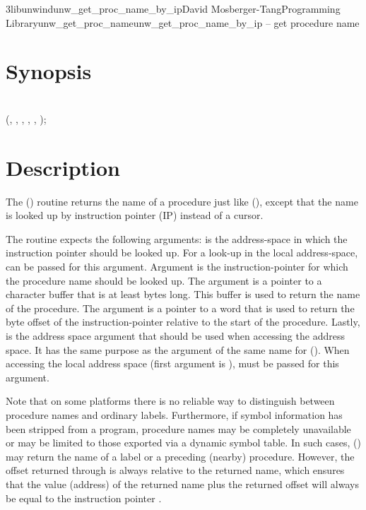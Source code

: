 \documentclass{article}
\begin{document}
\begin{Name}{3libunwind}{unw\_get\_proc\_name\_by\_ip}{David Mosberger-Tang}{Programming Library}{unw\_get\_proc\_name}unw\_get\_proc\_name\_by\_ip -- get procedure name
\end{Name}

\section{Synopsis}

\\

 (, , ,  , , );\\

\section{Description}

The () routine returns the name of
a procedure just like (), except that the
name is looked up by instruction pointer (IP) instead of a cursor.

The routine expects the following arguments:  is the
address-space in which the instruction pointer should be looked up.
For a look-up in the local address-space,
 can be passed for this argument.
Argument  is the instruction-pointer for which the procedure
name should be looked up.  The  argument is a pointer to
a character buffer that is at least  bytes long.  This buffer
is used to return the name of the procedure.  The  argument
is a pointer to a word that is used to return the byte offset of the
instruction-pointer relative to the start of the procedure.
Lastly,  is the address space argument that should be used
when accessing the address space.  It has the same purpose as the
argument of the same name for ().  When
accessing the local address space (first argument is
),  must be passed for this
argument.

Note that on some platforms there is no reliable way to distinguish
between procedure names and ordinary labels.  Furthermore, if symbol
information has been stripped from a program, procedure names may be
completely unavailable or may be limited to those exported via a
dynamic symbol table.  In such cases,
() may return the name of a label
or a preceding (nearby) procedure.  However, the offset returned
through  is always relative to the returned name, which
ensures that the value (address) of the returned name plus the
returned offset will always be equal to the instruction pointer
.
\end{document}
